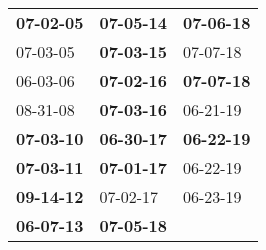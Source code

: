 \begin{supertabular}{p{0.33\columnwidth}p{0.33\columnwidth}p{0.33\columnwidth}}
 \textbf{07-02-05\textsuperscript{}} &  \textbf{07-05-14\textsuperscript{}} &  \textbf{07-06-18\textsuperscript{}} \\
          07-03-05\textsuperscript{} &  \textbf{07-03-15\textsuperscript{}} &           07-07-18\textsuperscript{} \\
          06-03-06\textsuperscript{} &  \textbf{07-02-16\textsuperscript{}} &  \textbf{07-07-18\textsuperscript{}} \\
          08-31-08\textsuperscript{} &  \textbf{07-03-16\textsuperscript{}} &           06-21-19\textsuperscript{} \\
 \textbf{07-03-10\textsuperscript{}} &  \textbf{06-30-17\textsuperscript{}} &  \textbf{06-22-19\textsuperscript{}} \\
 \textbf{07-03-11\textsuperscript{}} &  \textbf{07-01-17\textsuperscript{}} &           06-22-19\textsuperscript{} \\
 \textbf{09-14-12\textsuperscript{}} &           07-02-17\textsuperscript{} &           06-23-19\textsuperscript{} \\
 \textbf{06-07-13\textsuperscript{}} &  \textbf{07-05-18\textsuperscript{}} &                                      \\
\end{supertabular}
